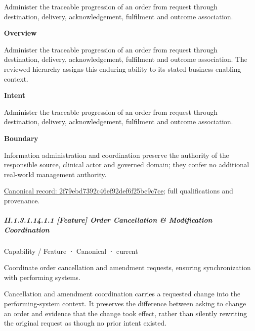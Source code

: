 Administer the traceable progression of an order from request through destination, delivery, acknowledgement, fulfilment and outcome association.



\textbf{Overview}



Administer the traceable progression of an order from request through destination, delivery, acknowledgement, fulfilment and outcome association. The reviewed hierarchy assigns this enduring ability to its stated business-enabling context.



\textbf{Intent}



Administer the traceable progression of an order from request through destination, delivery, acknowledgement, fulfilment and outcome association.



\textbf{Boundary}



Information administration and coordination preserve the authority of the responsible source, clinical actor and governed domain; they confer no additional real-world management authority.


{\footnotesize \href{../../../../continuum/strategy/capability/2f79ebd7392c46ef92def6f25bc9c7ce.md}{Canonical record: 2f79ebd7392c46ef92def6f25bc9c7ce}; full qualifications and provenance.}\par
\subparagraph*{II.1.3.1.14.1.1 [Feature] Order Cancellation \& Modification Coordination}
\label{navigation:II.1.3.1.14.1.1}

\label{element:6d12d9ddf4f8425ca60b289f3356f683}
{\small Capability / Feature · Canonical · current}\par

Coordinate order cancellation and amendment requests, ensuring synchronization with performing systems.



Cancellation and amendment coordination carries a requested change into the performing-system context. It preserves the difference between asking to change an order and evidence that the change took effect, rather than silently rewriting the original request as though no prior intent existed.


